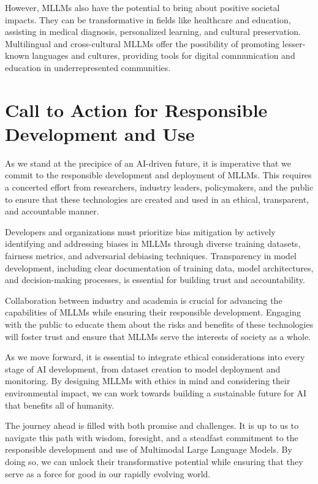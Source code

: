 However, MLLMs also have the potential to bring about positive societal impacts. They can be transformative in fields like healthcare and education, assisting in medical diagnosis, personalized learning, and cultural preservation. Multilingual and cross-cultural MLLMs offer the possibility of promoting lesser-known languages and cultures, providing tools for digital communication and education in underrepresented communities.

\section{Call to Action for Responsible Development and Use}

As we stand at the precipice of an AI-driven future, it is imperative that we commit to the responsible development and deployment of MLLMs. This requires a concerted effort from researchers, industry leaders, policymakers, and the public to ensure that these technologies are created and used in an ethical, transparent, and accountable manner.

Developers and organizations must prioritize bias mitigation by actively identifying and addressing biases in MLLMs through diverse training datasets, fairness metrics, and adversarial debiasing techniques. Transparency in model development, including clear documentation of training data, model architectures, and decision-making processes, is essential for building trust and accountability.

Collaboration between industry and academia is crucial for advancing the capabilities of MLLMs while ensuring their responsible development. Engaging with the public to educate them about the risks and benefits of these technologies will foster trust and ensure that MLLMs serve the interests of society as a whole.

As we move forward, it is essential to integrate ethical considerations into every stage of AI development, from dataset creation to model deployment and monitoring. By designing MLLMs with ethics in mind and considering their environmental impact, we can work towards building a sustainable future for AI that benefits all of humanity.

The journey ahead is filled with both promise and challenges. It is up to us to navigate this path with wisdom, foresight, and a steadfast commitment to the responsible development and use of Multimodal Large Language Models. By doing so, we can unlock their transformative potential while ensuring that they serve as a force for good in our rapidly evolving world.

